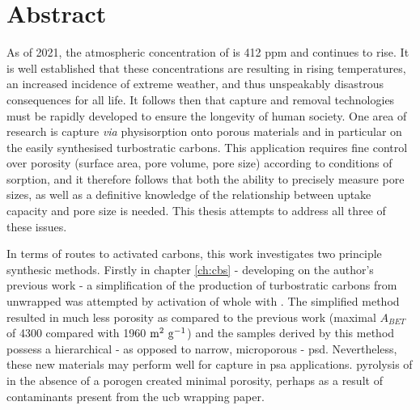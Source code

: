 \cleardoublepage

\chapter*{Abstract} \label{Abstract}

As of 2021, the atmospheric concentration of  is 412 ppm and continues to rise. It is well established that these concentrations are resulting in rising temperatures, an increased incidence of extreme weather, and thus unspeakably disastrous consequences for all life. It follows then that  capture and removal technologies must be rapidly developed to ensure the longevity of human society. One area of research is  capture \textit{via} \gls{physisorption} onto porous materials and in particular on the easily synthesised \glspl{turbostratic carbon}. This application requires fine control over porosity (surface area, pore volume, pore size) according to conditions of sorption, and it therefore follows that both the ability to precisely measure pore sizes, as well as a definitive knowledge of the relationship between  uptake capacity and pore size is needed. This thesis attempts to address all three of these issues.

In terms of routes to \glspl{activated carbon}, this work investigates two principle synthesic methods. Firstly in chapter \ref{ch:cbs} - developing on the author's previous work - a simplification of the production of \glspl{turbostratic carbon} from unwrapped  was attempted by \gls{activation} of whole  with . The simplified method resulted in much less porosity as compared to the previous work (maximal $A_{BET}$ of 4300 compared with 1960 $\rm m^2\ g^{-1}$) and the samples derived by this method possess a hierarchical - as opposed to narrow, microporous - \acrfull{psd}. Nevertheless, these new materials may perform well for  capture in \acrfull{psa} applications. \Gls{pyrolysis} of  in the absence of a \gls{porogen} created minimal porosity, perhaps as a result of contaminants present from the \acrshort{ucb} wrapping paper. 

